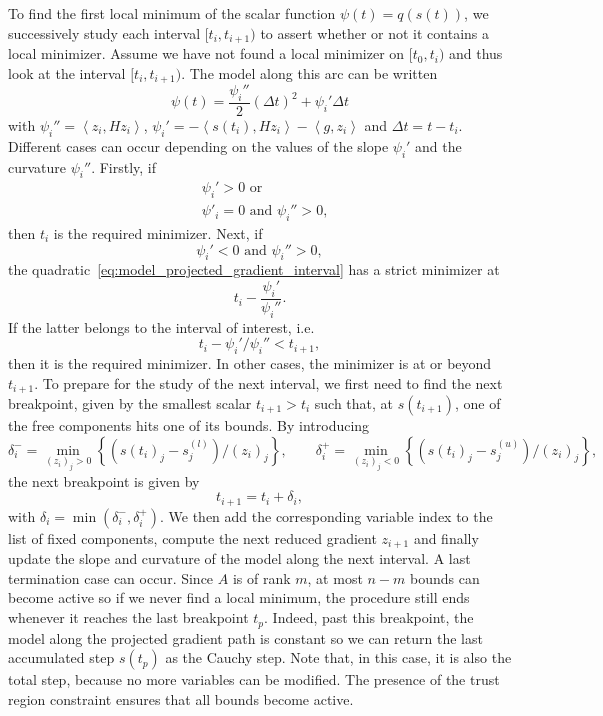 \documentclass{article}
\numberwithin{equation}{section}
\newcommand{\inner}[2]{\left\langle {#1} , {#2} \right\rangle} %
\theoremstyle{plain}
\begin{document}
	To find the first local minimum of the scalar function $\psi(t) = q(s(t))$, we successively study each interval $[t_i,t_{i+1})$ to assert whether or not it contains a local minimizer.
	Assume we have not found a local minimizer on $[t_0,t_i)$ and thus look at the interval $[t_i,t_{i+1})$. The model along this arc can be written
	\begin{equation}\label{eq:model_projected_gradient_interval}
		\psi(t) = \dfrac{\psi_i''}{2}(\Delta t)^2 + \psi_i'\Delta t
	\end{equation}
	with
	$\psi_i'' = \inner{z_i}{Hz_i}$, $\psi_i' = -\inner{s(t_i)}{Hz_i} - \inner{g}{z_i}$ and $\Delta t = t-t_i$.
	Different cases can occur depending on the values of the slope $\psi_i'$ and the curvature $\psi_i''$. 
	Firstly, if
	\begin{align*}
		&\psi_i' > 0 \text{ or } \\
		&\psi'_i=0 \text{ and } \psi_i'' > 0,
	\end{align*}
	then $t_i$ is the required minimizer. Next, if
	\[\psi_i' < 0 \text{ and } \psi_i'' > 0,\]
	the quadratic~\eqref{eq:model_projected_gradient_interval} has a strict minimizer at
	\[t_i- \dfrac{\psi_i'}{\psi_i''}.\]
	If the latter belongs to the interval of interest, i.e. 
	\[t_i-\psi_i'/\psi_i'' < t_{i+1},\]
	then it is the required minimizer. In other cases, the minimizer is at or beyond $t_{i+1}$. To prepare for the study of the next interval, we first need to find the next breakpoint, given by the smallest scalar $t_{i+1}>t_i$ such that, at $s(t_{i+1})$, one of the free components hits one of its bounds. By introducing
	\[\delta_i^- = \min_{(z_i)_j > 0} \left\{ (s(t_i)_j - s^{(l)}_j)/(z_i)_j\right\}, \qquad \delta_i^+ = \min_{(z_i)_j < 0} \left\{(s(t_i)_j - s^{(u)}_j)/(z_i)_j\right\},\]
	the next breakpoint is given by 
	\begin{equation}\label{eq:next_breakpoint}
		t_{i+1} = t_i + \delta_i,
	\end{equation} 
	with $\delta_i = \min\left(\delta_i^-,\delta_i^+\right)$. We then add the corresponding variable index to the list of fixed components, compute the next reduced gradient $z_{i+1}$ and finally update the slope and curvature of the model along the next interval. A last termination case can occur. Since $A$ is of rank $m$, at most $n-m$ bounds can become active so if we never find a local minimum, the procedure still ends whenever it reaches the last breakpoint $t_{p}$. Indeed, past this breakpoint, the model along the projected gradient path is constant so we can return the last accumulated step $s(t_p)$ as the Cauchy step. Note that, in this case, it is also the total step, because no more variables can be modified. The presence of the trust region constraint ensures that all bounds become active. 
\end{document}
